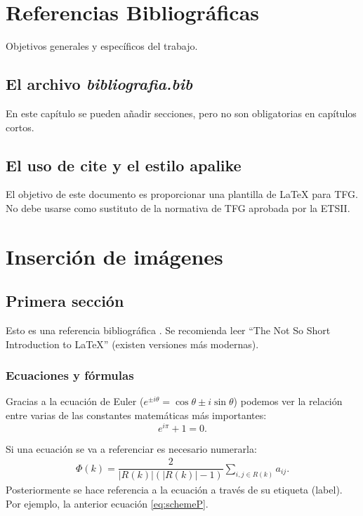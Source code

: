 \documentclass[twoside]{tfg-urjc}
\begin{document}
\chapter{Referencias Bibliográficas}
\label{sec:bib}

Objetivos generales y específicos del trabajo.

\section{El archivo \emph{bibliografia.bib}}

En este capítulo se pueden añadir secciones, pero no son obligatorias
en capítulos cortos.

\section{El uso de cite y el estilo apalike}

El objetivo de este documento es proporcionar una plantilla de \LaTeX
para TFG. No debe usarse como sustituto de la normativa de TFG
aprobada por la ETSII.



\chapter{Inserción de imágenes}




\section{Primera sección}

Esto es una referencia bibliográfica . Se recomienda
leer ``The Not So Short Introduction to \LaTeX'' \cite{Oetiker2007}
(existen versiones más modernas).


\subsection{Ecuaciones y fórmulas}

Gracias a la ecuación de Euler
($e^{ \pm i\theta } = \cos \theta \pm i\sin \theta$) podemos ver la
relación entre varias de las constantes matemáticas más importantes:
\[
    e^{i\pi} + 1 = 0.
\]


Si una ecuación se va a referenciar es necesario numerarla:
\begin{eqnarray}
\label{eq:schemeP}
 \Phi (k)=\dfrac{2}{|R(k)|(|R(k)|-1)} \underset{i,j \in R(k)}{\sum} a_{ij}.
\end{eqnarray}
Posteriormente se hace referencia a la ecuación a través de su
etiqueta (label). Por ejemplo, la anterior ecuación
\eqref{eq:schemeP}.
\end{document}
